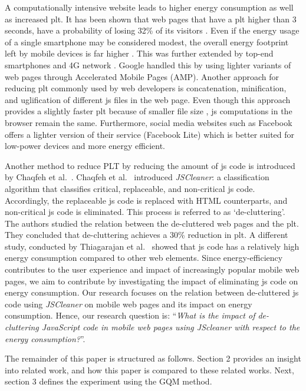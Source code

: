 A computationally intensive website leads to higher energy consumption as well as increased \acrfull{plt}. It has been shown that web pages that have a \acrshort{plt} higher than 3 seconds, have a probability of losing 32\% of its visitors \cite{googlemobbench}. 
Even if the energy usage of a single smartphone may be considered modest, the overall energy footprint left by mobile devices is far higher \cite{timeenergy}. This was further extended by top-end smartphones and 4G network \cite{chen2014demystifying}. Google handled this by using lighter variants of web pages through Accelerated Mobile Pages (AMP). Another approach for reducing \acrshort{plt} commonly used by web developers is concatenation, minification, and uglification of different \acrshort{js} files in the web page. Even though this approach provides a slightly faster \acrshort{plt} because of smaller file size \cite{improvewebspeed}, \acrshort{js} computations in the browser remain the same. Furthermore, social media websites such as Facebook offers a lighter version of their service (Facebook Lite) which is better suited for low-power devices and more energy efficient.

Another method to reduce PLT by reducing the amount of \acrshort{js} code is introduced by Chaqfeh et al.~\cite{chaqfeh2020jscleaner}. Chaqfeh et al.~\cite{chaqfeh2020jscleaner} introduced \textit{JSCleaner}: a classification algorithm that classifies critical, replaceable, and non-critical \acrshort{js} code. Accordingly, the replaceable \acrshort{js} code is replaced with HTML counterparts, and non-critical \acrshort{js} code is eliminated. This process is referred to as `de-cluttering'. The authors studied the relation between the de-cluttered web pages and the \acrshort{plt}. They concluded that de-cluttering achieves a 30\% reduction in \acrshort{plt}. A different study, conducted by Thiagarajan et al.~\cite{thiagarajan2012battery} showed that \acrshort{js} code has a relatively high energy consumption compared to other web elements. Since energy-efficiency contributes to the user experience and impact of increasingly popular mobile web pages, we aim to contribute by investigating the impact of eliminating \acrshort{js} code on energy consumption. Our research focuses on the relation between de-cluttered \acrshort{js} code using \textit{JSCleaner} on mobile web pages and its impact on energy consumption. Hence, our research question is: ``\textit{What is the impact of de-cluttering JavaScript code in mobile web pages using \textit{JScleaner} with respect to the energy consumption?}''.


The remainder of this paper is structured as follows. Section 2 provides an insight into related work, and how this paper is compared to these related works. Next, section 3 defines the experiment using the GQM method. 

